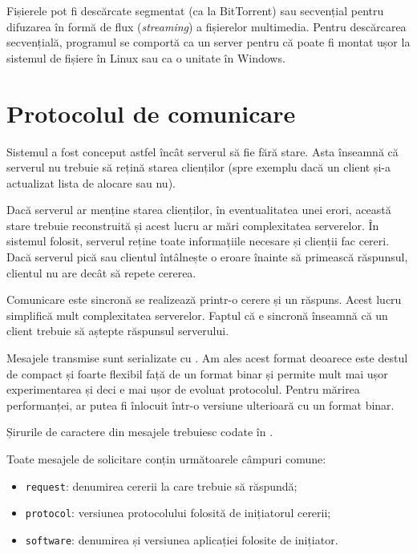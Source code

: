 \documentclass[a4wide,12pt]{report}
\newcommand{\eng}[1]{\emph{#1}} %
\newcommand{\cod}[1]{\texttt{#1}}
\newcommand{\acr}[1]{{\textsmaller[1]{\textsc{#1}}}} %
\begin{document}
Fișierele pot fi descărcate segmentat (ca la BitTorrent) sau secvențial pentru difuzarea în formă de flux
(\eng{streaming}) a fișierelor multimedia. Pentru descărcarea secvențială, programul se comportă ca un server \acr{FTP}
pentru că poate fi montat ușor la sistemul de fișiere în Linux sau ca o unitate în Windows.

\section{Protocolul de comunicare} %

Sistemul a fost conceput astfel încât serverul să fie fără stare. Asta înseamnă că serverul nu trebuie să rețină starea
clienților (spre exemplu dacă un client și-a actualizat lista de alocare sau nu).

Dacă serverul ar menține starea clienților, în eventualitatea unei erori, această stare trebuie reconstruită și acest
lucru ar mări complexitatea serverelor. În sistemul folosit, serverul reține toate informațiile necesare și clienții fac
cereri. Dacă serverul pică sau clientul întâlnește o eroare înainte să primească răspunsul, clientul nu are decât să
repete cererea.

Comunicare este sincronă se realizează printr-o cerere și un răspuns. Acest lucru simplifică mult complexitatea
serverelor. Faptul că e sincronă înseamnă că un client trebuie să aștepte răspunsul serverului.

Mesajele transmise sunt serializate cu \acr{JSON}. Am ales acest format deoarece este destul de compact și foarte
flexibil față de un format binar și permite mult mai ușor experimentarea și deci e mai ușor de evoluat protocolul.
Pentru mărirea performanței, \acr{JSON} ar putea fi înlocuit într-o versiune ulterioară cu un format binar.

Șirurile de caractere din mesajele \acr{JSON} trebuiesc codate în \acr{UTF-8}.

Toate mesajele de solicitare conțin următoarele câmpuri comune:

\begin{itemize}
\item \cod{request}: denumirea cererii la care trebuie să răspundă;
\item \cod{protocol}: versiunea protocolului folosită de inițiatorul cererii;
\item \cod{software}: denumirea și versiunea aplicației folosite de inițiator.
\end{itemize}
\end{document}

